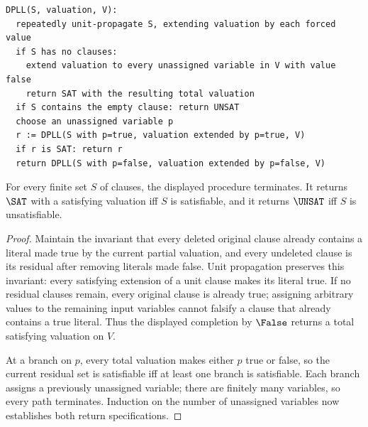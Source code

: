 \begin{lstlisting}[caption={Logical core of a DPLL satisfiability procedure}]
DPLL(S, valuation, V):
  repeatedly unit-propagate S, extending valuation by each forced value
  if S has no clauses:
    extend valuation to every unassigned variable in V with value false
    return SAT with the resulting total valuation
  if S contains the empty clause: return UNSAT
  choose an unassigned variable p
  r := DPLL(S with p=true, valuation extended by p=true, V)
  if r is SAT: return r
  return DPLL(S with p=false, valuation extended by p=false, V)
\end{lstlisting}

\begin{theorem}
For every finite set \(S\) of clauses, the displayed
procedure terminates.  It returns \(\SAT\) with a satisfying valuation iff
\(S\) is satisfiable, and it returns \(\UNSAT\) iff \(S\) is
unsatisfiable.
\end{theorem}
\begin{proof}
Maintain the invariant that every deleted original clause already contains a
literal made true by the current partial valuation, and every undeleted clause
is its residual after removing literals made false.  Unit propagation preserves
this invariant: every satisfying extension of a unit clause makes its literal
true.  If no residual clauses remain, every original clause is already true;
assigning arbitrary values to the remaining input variables cannot falsify a
clause that already contains a true literal.  Thus the displayed completion by
\(\False\) returns a total satisfying valuation on \(V\).

At a branch on \(p\), every total valuation makes either \(p\) true or false,
so the current residual set is satisfiable iff at least one branch is
satisfiable.  Each branch assigns a previously unassigned variable; there are
finitely many variables, so every path terminates.  Induction on the number of
unassigned variables now establishes both return specifications.
\end{proof}

